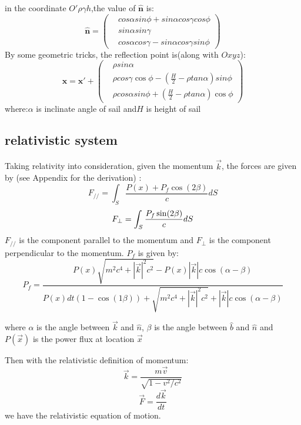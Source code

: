 \documentclass{article}
\begin{document}
in the coordinate $O'\rho\gamma h$,the value of $\hat{\boldsymbol{n}}$ is:
\begin{equation}
\hat{\boldsymbol{n}} = 
\begin{pmatrix}
&cos\alpha sin\phi +sin\alpha cos\gamma cos\phi\\
&sin\alpha sin\gamma\\
&cos\alpha cos\gamma - sin\alpha cos\gamma sin\phi
\end{pmatrix}
\end{equation}
By some geometric tricks, the reflection point is(along with $Oxyz$):
\begin{equation}
\boldsymbol{x} = \boldsymbol{x'} + 
\begin{pmatrix}
&\rho sin\alpha\\
&\rho cos\gamma\cos\phi -(\frac{H}{2}-\rho tan\alpha)sin\phi\\
&\rho cos\alpha sin\phi + (\frac{H}{2}-\rho tan\alpha)\cos\phi
\end{pmatrix}
\end{equation}
where:$\alpha$ is inclinate angle of sail and$H$ is height of sail\\


\subsection{relativistic system}
Taking relativity into consideration, given the momentum $\vec{k}$, the forces are given by (see Appendix for the derivation) :
\begin{equation}
	F_{//}=\int_S \frac{P(x) +P_f \cos (2\beta) }{c} dS 
\end{equation}
\begin{equation}
	F_{\perp}=\int_S \frac{P_f \sin (2\beta)}{c} dS \\
\end{equation}
$F_{//}$ is the component parallel to the momentum and $F_\perp$ is the component perpendicular to the momentum.
$P_f$ is given by:
\begin{equation}
	P_f=\frac{P(x) \sqrt{m^2c^4+|\vec{k}|^2c^2 } - P(x)|\vec{k}|c \cos(\alpha- \beta) }{P(x)dt (1-\cos(1\beta)) +\sqrt{m^2c^4+|\vec{k}|^2c^2 } + |\vec{k}|c \cos(\alpha- \beta) }
\end{equation}

where $\alpha$ is the angle between $\vec{k}$ and $\hat{n}$, $\beta$ is the angle between $\hat{b}$ and $\hat{n}$ and $P(\vec x)$ is the power flux at location $\vec x$

Then with the relativistic definition of momentum:
\begin{equation}
	\vec k = \frac{m \vec v}{\sqrt{1-v^2/c^2}}
\end{equation}
\begin{equation}
	\vec{F} = \frac{d \vec k}{dt}
\end{equation}
we have the relativistic equation of motion. 
\end{document}
